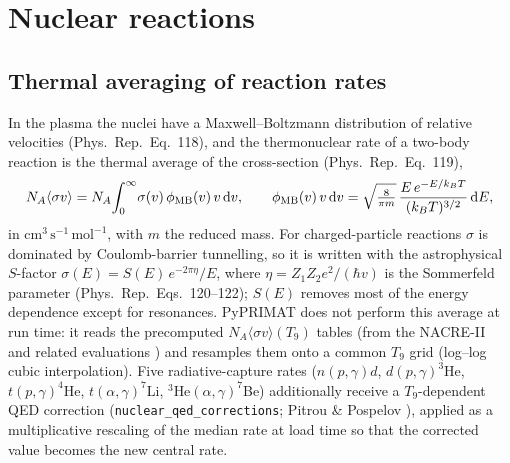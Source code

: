 \documentclass[11pt,a4paper]{article}
\newcommand{\dd}{\mathrm{d}}
\newcommand{\sigmav}{\langle\sigma v\rangle}
\newcommand{\code}[1]{\texttt{#1}}
\newcommand{\PR}{Phys.\ Rep.}
\newcommand{\NA}{N_A}
\begin{document}
\section{Nuclear reactions}\label{sec:nuclear}

\subsection{Thermal averaging of reaction rates}
In the plasma the nuclei have a Maxwell--Boltzmann distribution of relative
velocities (\PR\ Eq.~118), and the thermonuclear rate of a two-body reaction is
the thermal average of the cross-section (\PR\ Eq.~119),
\begin{equation}
  \NA\sigmav = \NA\!\int_0^\infty\!\sigma(v)\,\phi_{\rm MB}(v)\,v\,\dd v,
  \qquad
  \phi_{\rm MB}(v)\,v\,\dd v = \sqrt{\tfrac{8}{\pi m}}\,
     \frac{E\,e^{-E/k_BT}}{(k_BT)^{3/2}}\,\dd E,
\label{eq:thermalavg}
\end{equation}
in $\mathrm{cm^3\,s^{-1}\,mol^{-1}}$, with $m$ the reduced mass. For
charged-particle reactions $\sigma$ is dominated by Coulomb-barrier tunnelling,
so it is written with the astrophysical $S$-factor
$\sigma(E)=S(E)\,e^{-2\pi\eta}/E$, where $\eta=Z_1Z_2 e^2/(\hbar v)$ is the
Sommerfeld parameter (\PR\ Eqs.~120--122); $S(E)$ removes most of the energy
dependence except for resonances. PyPRIMAT does not perform this average at run
time: it reads the precomputed $\NA\sigmav(T_9)$ tables (from the NACRE-II and
related evaluations \cite{NACRE2,Coc2012}) and resamples them onto a common $T_9$
grid (log--log cubic interpolation). Five radiative-capture rates
($n(p,\gamma)d$, $d(p,\gamma)^3$He, $t(p,\gamma)^4$He, $t(\alpha,\gamma)^7$Li,
$^3$He$(\alpha,\gamma)^7$Be) additionally receive a $T_9$-dependent QED
correction (\code{nuclear\_qed\_corrections}; Pitrou \& Pospelov
\cite{PitrouPospelov2020}), applied as a multiplicative rescaling of the median
rate at load time so that the corrected value becomes the new central rate.
\end{document}
